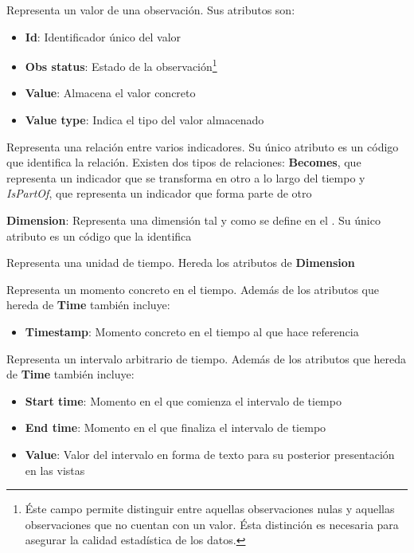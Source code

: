 \begin{description}
\begin{itemize}
		\end{itemize}
	\item[Value]  Representa un valor de una observación.  Sus atributos son:
		\begin{itemize}
			\item \textbf{Id}:  Identificador único del valor
			\item \textbf{Obs status}:  Estado de la observación\footnote{Éste campo permite distinguir entre aquellas observaciones nulas y aquellas observaciones que no cuentan con un valor.  Ésta distinción es necesaria para asegurar la calidad estadística de los datos.}
			\item \textbf{Value}:  Almacena el valor concreto
			\item \textbf{Value type}:  Indica el tipo del valor almacenado
		\end{itemize}
	\item[IndicatorRelationship]  Representa una relación entre varios indicadores.  Su único atributo es un código que identifica la relación.  Existen dos tipos de relaciones:  \textbf{Becomes}, que representa un indicador que se transforma en otro a lo largo del tiempo y \textit{IsPartOf}, que representa un indicador que forma parte de otro
	\item \textbf{Dimension}:  Representa una dimensión tal y como se define en el .  Su único atributo es un código que la identifica
	\item[Time]  Representa una unidad de tiempo.  Hereda los atributos de \textbf{Dimension}
	\item[Instant]  Representa un momento concreto en el tiempo.  Además de los atributos que hereda de \textbf{Time} también incluye:
	\begin{itemize}
		\item \textbf{Timestamp}:  Momento concreto en el tiempo al que hace referencia
	\end{itemize}
	\item[Interval]  Representa un intervalo arbitrario de tiempo.  Además de los atributos que hereda de \textbf{Time} también incluye:
	\begin{itemize}
		\item \textbf{Start time}:  Momento en el que comienza el intervalo de tiempo
		\item \textbf{End time}:  Momento en el que finaliza el intervalo de tiempo
		\item \textbf{Value}:  Valor del intervalo en forma de texto para su posterior presentación en las vistas

\end{itemize}
\end{description}
